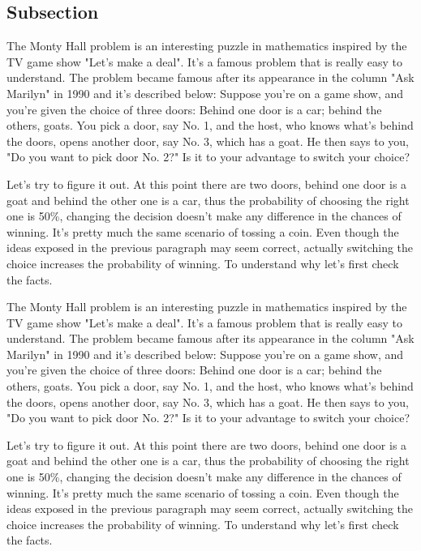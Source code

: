 \documentclass{oscmjournal}
\begin{document}
\subsection{Subsection}
The Monty Hall problem is an interesting puzzle in mathematics inspired by the TV  game show "Let's make a deal". It's a famous problem that is really easy to understand. The problem became famous after its appearance in the column "Ask Marilyn" in 1990 and  it's described below: Suppose you're on a game show, and you're given the choice of three doors: Behind one  door is a car; behind the others, goats. You pick a door, say No. 1, and the host, who  knows what's behind the doors, opens another door, say No. 3, which has a goat. He then  says to you, "Do you want to pick door No. 2?" Is it to your advantage to switch your choice?

Let's try to figure it out. At this point there are two doors, behind one door is a goat  and behind the other one is a car, thus the probability of choosing the right one is 50\%, changing the decision doesn't make any difference in the chances of winning. It's pretty much the same scenario of tossing a coin. Even though the ideas exposed in the previous paragraph may seem correct, actually switching the choice increases the probability of winning. To understand why let's  first check the facts.

The Monty Hall problem is an interesting puzzle in mathematics inspired by the TV  game show "Let's make a deal". It's a famous problem that is really easy to understand. The problem became famous after its appearance in the column "Ask Marilyn" in 1990 and  it's described below: Suppose you're on a game show, and you're given the choice of three doors: Behind one  door is a car; behind the others, goats. You pick a door, say No. 1, and the host, who  knows what's behind the doors, opens another door, say No. 3, which has a goat. He then  says to you, "Do you want to pick door No. 2?" Is it to your advantage to switch your choice?

Let's try to figure it out. At this point there are two doors, behind one door is a goat  and behind the other one is a car, thus the probability of choosing the right one is 50\%, changing the decision doesn't make any difference in the chances of winning. It's pretty much the same scenario of tossing a coin. Even though the ideas exposed in the previous paragraph may seem correct, actually switching the choice increases the probability of winning. To understand why let's  first check the facts.
\end{document}
